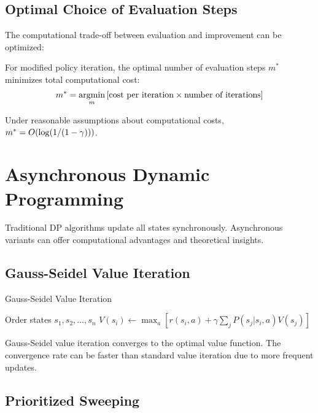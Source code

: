 \subsection{Optimal Choice of Evaluation Steps}

The computational trade-off between evaluation and improvement can be optimized:

\begin{theorem}
For modified policy iteration, the optimal number of evaluation steps $m^*$ minimizes total computational cost:
\begin{equation}
m^* = \operatorname*{argmin}_m \left[\text{cost per iteration} \times \text{number of iterations}\right]
\end{equation}

Under reasonable assumptions about computational costs, $m^* = O(\log(1/(1-\gamma)))$.
\end{theorem}

\section{Asynchronous Dynamic Programming}

Traditional DP algorithms update all states synchronously. Asynchronous variants can offer computational advantages and theoretical insights.

\subsection{Gauss-Seidel Value Iteration}

\begin{algorithm}
\caption{Gauss-Seidel Value Iteration}
\begin{algorithmic}
\STATE Order states $s_1, s_2, \ldots, s_n$
\REPEAT
        \STATE $V(s_i) \leftarrow \max_a \left[r(s_i,a) + \gamma \sum_{j} P(s_j|s_i,a) V(s_j)\right]$
    \ENDFOR
{}
\end{algorithmic}
\end{algorithm}

\begin{theorem}
Gauss-Seidel value iteration converges to the optimal value function. The convergence rate can be faster than standard value iteration due to more frequent updates.
\end{theorem}

\subsection{Prioritized Sweeping}

